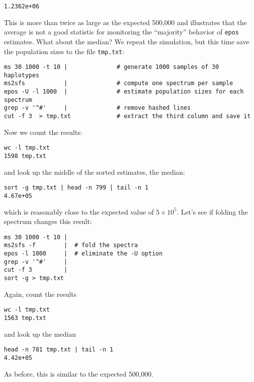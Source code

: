 \documentclass[a4paper, english]{article}
\newcommand{\ty}{\texttt}
\begin{document}
\begin{itemize}
\begin{verbatim}
1.2362e+06
\end{verbatim}
This is more than twice as large as the expected 500,000 and
illustrates that the average is not a good statistic for monitoring
the ``majority'' behavior of \ty{epos} estimates. What about the
median? We repeat the simulation, but this time save the population
sizes to the file \ty{tmp.txt}:
\begin{verbatim}
ms 30 1000 -t 10 |              # generate 1000 samples of 30 haplotypes
ms2sfs           |              # compute one spectrum per sample
epos -U -l 1000  |              # estimate population sizes for each spectrum
grep -v '^#'     |              # remove hashed lines
cut -f 3  > tmp.txt             # extract the third column and save it
\end{verbatim}
Now we count the results:
\begin{verbatim}
wc -l tmp.txt 
1598 tmp.txt
\end{verbatim}
and look up the middle of the sorted estimates, the median:
\begin{verbatim}
sort -g tmp.txt | head -n 799 | tail -n 1
4.67e+05
\end{verbatim}
which is reasonably close to the expected value of $5\times
10^5$. 
Let's see if folding the
spectrum changes this result:
\begin{verbatim}
ms 30 1000 -t 10 | 
ms2sfs -f        |  # fold the spectra 
epos -l 1000     |  # eliminate the -U option
grep -v '^#'     |
cut -f 3         |
sort -g > tmp.txt
\end{verbatim}
Again, count the results
\begin{verbatim}
wc -l tmp.txt 
1563 tmp.txt
\end{verbatim}
and look up the median
\begin{verbatim}
head -n 781 tmp.txt | tail -n 1
4.42e+05
\end{verbatim}
As before, this is similar to the expected 500,000. 
\end{itemize}
\end{document}
